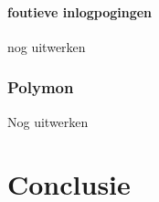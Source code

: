 \documentclass[pdftex,a4paper,12pt]{report}
\begin{document}
\subsubsection{foutieve inlogpogingen}
nog uitwerken

\subsection{Polymon}
Nog uitwerken


\chapter{Conclusie}
\label{ch:conclusie}








\listoffigures
\listoftables
\end{document}
